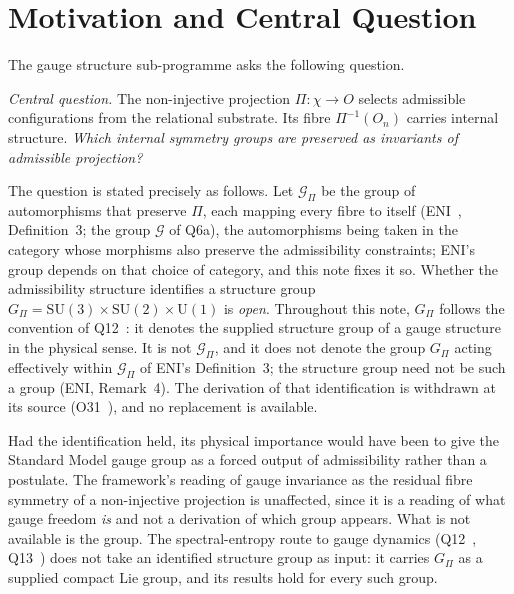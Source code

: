 \documentclass[11pt,a4paper]{article}
\theoremstyle{definition}
\newcommand{\SU}{\mathrm{SU}}
\newcommand{\UU}{\mathrm{U}}
\newcommand{\Gpi}{G_{\Pi}}
\begin{document}
  \newpage
  \tableofcontents

  \newpage

  \section{Motivation and Central Question}
    \label{sec:motivation}

    The gauge structure sub-programme asks the following question.

    \medskip
    \noindent\textit{Central question.}
    The non-injective projection $\Pi: \chi \to O$ selects admissible configurations from the
    relational substrate.
    Its fibre $\Pi^{-1}(O_n)$ carries internal structure.
    \textit{Which internal symmetry groups are preserved as invariants of admissible projection?}

    \medskip
    The question is stated precisely as follows.
    Let $\mathcal{G}_\Pi$ be the group of automorphisms that preserve $\Pi$, each mapping every fibre
    to itself (ENI~\cite{Beau2026l}, Definition~3; the group $\mathcal{G}$ of Q6a), the automorphisms
    being taken in the category whose morphisms also preserve the admissibility constraints; ENI's
    group depends on that choice of category, and this note fixes it so.
    Whether the admissibility structure identifies a structure group
    $\Gpi = \SU(3) \times \SU(2) \times \UU(1)$ is \emph{open}.
    Throughout this note, $\Gpi$ follows the convention of Q12~\cite{Beau2026q12}: it denotes the
    supplied structure group of a gauge structure in the physical sense.
    It is not $\mathcal{G}_\Pi$, and it does not denote the group $G_\Pi$ acting effectively within
    $\mathcal{G}_\Pi$ of ENI's Definition~3; the structure group need not be such a group
    (ENI, Remark~4).
    The derivation of that identification is withdrawn at its source (O31~\cite{Beau2026a35}), and
    no replacement is available.

    \medskip
    Had the identification held, its physical importance would have been to give the Standard Model
    gauge group as a forced output of admissibility rather than a postulate.
    The framework's reading of gauge invariance as the residual fibre symmetry of a non-injective
    projection is unaffected, since it is a reading of what gauge freedom \emph{is} and not a
    derivation of which group appears.
    What is not available is the group.
    The spectral-entropy route to gauge dynamics (Q12~\cite{Beau2026q12},
    Q13~\cite{Beau2026q13}) does not take an identified structure group as input: it carries $\Gpi$ as a
    supplied compact Lie group, and its results hold for every such group.
\end{document}
